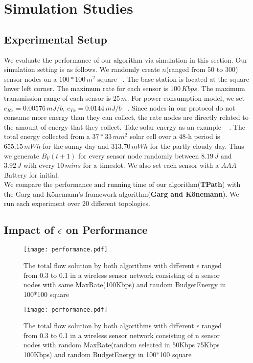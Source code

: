 \documentclass{article}
\begin{document}
\section{Simulation Studies}
\subsection{Experimental Setup}
We evaluate the performance of our algorithm via simulation in this section.
Our simulation setting is as follows. We randomly create $n$(ranged from $50$ to $300$) sensor nodes
on a $100*100\,m^2$ square ~\cite{Maxi}. The base station is located at the square lower left corner. The maximum rate for each sensor is $100\,Kbps$. The maximum transmission range of each sensor is $25\,m$. For power consumption model, we set $e_{Rx} = 0.00576\,mJ/b$, $e_{Tx} = 0.0144\,mJ/b$ ~\cite{Ene}. Since nodes in our protocol do not
consume more energy than they can collect, the rate nodes are directly related to the amount of energy that they collect. Take solar energy as an example ~\cite{Ste} . The total energy collected from a $37 * 33\,mm^2$ solar cell over a 48-h period is $655.15\,mWh$ for the sunny day and $313.70\,mWh$ for the partly cloudy day. Thus we generate $B_V(t+1)$ for every sensor node randomly between $8.19\,J$ and $3.92\,J$ with every $10\,mins$ for a timeslot. We also set each sensor with a $AAA$ Battery for initial.\\
We compare the performance and running time of our algorithm(\textbf{TPath}) with the Garg and K\"{o}nemann's framework algorithm(\textbf{Garg and K\"{o}nemann}). We run each experiment over 20 different topologies.

\subsection{Impact of $\epsilon$ on Performance}

\begin{figure}[htbp]
\centering
\texttt{[image: performance.pdf]}
\caption{The total flow solution by both algorithms with different $\epsilon$ ranged from 0.3 to 0.1 in a wireless sensor network consisting of n sensor nodes with same MaxRate(100Kbps) and random BudgetEnergy in 100*100 square}
\label{fig:performance}
\end{figure}

\begin{figure}[htbp]
\centering
\texttt{[image: performance.pdf]}
\caption{The total flow solution by both algorithms with different $\epsilon$ ranged from 0.3 to 0.1 in a wireless sensor network consisting of n sensor nodes with random MaxRate(random selected in 50Kbps 75Kbps 100Kbps) and random BudgetEnergy in 100*100 square}
\label{fig:Rperformance}
\end{figure}
\end{document}

